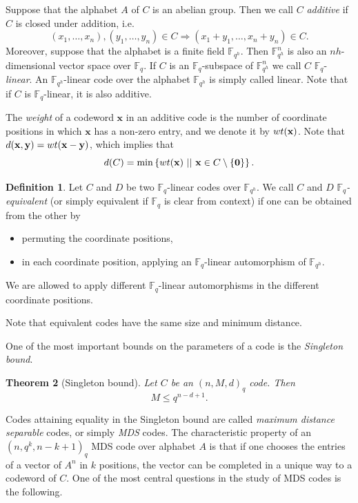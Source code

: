 \documentclass[a4paper]{article}
\newtheorem{thm}{Theorem}[section]
\theoremstyle{definition}
\newtheorem{df}[thm]{Definition}
\newcommand{\FF}{\mathbb F}
\newcommand{\set}[1]{ \left \{ #1 \right \} }
\newcommand{\sett}[2]{ \left\{ #1 \, \, || \, \, #2 \right \} }
\newcommand{\zero}{\mathbf 0}
\newcommand{\wt}{\textnormal{wt}}
\newcommand{\xx}{\mathbf x}
\newcommand{\yy}{\mathbf y}
\begin{document}
Suppose that the alphabet $A$ of $C$ is an abelian group.
Then we call $C$ \emph{additive} if $C$ is closed under addition, i.e.\
\[
 (x_1, \dots, x_n), (y_1,\dots,y_n) \in C \Longrightarrow (x_1+y_1, \dots, x_n+y_n) \in C.
\]
Moreover, suppose that the alphabet is a finite field $\FF_{q^h}$.
Then $\FF_{q^h}^n$ is also an $nh$-dimensional vector space over $\FF_q$.
If $C$ is an $\FF_q$-subspace of $\FF_{q^h}^n$ we call $C$ $\FF_q$-\emph{linear}.
An $\FF_{q^h}$-linear code over the alphabet $\FF_{q^h}$ is simply called linear.
Note that if $C$ is $\FF_q$-linear, it is also additive.

The \emph{weight} of a codeword $\xx$ in an additive code is the number of coordinate positions in which $\xx$ has a non-zero entry, and we denote it by $\wt(\xx)$.
Note that $d(\xx,\yy) = \wt(\xx-\yy)$, which implies that
\[
 d(C) = \min \sett{ \wt(\xx) }{ \xx \in C \setminus \set \zero }.
\]

\begin{df}
 \label{DefEq}
 Let $C$ and $D$ be two $\FF_q$-linear codes over $\FF_{q^h}$.
 We call $C$ and $D$ \emph{$\FF_q$-equivalent} (or simply equivalent if $\FF_q$ is clear from context) if one can be obtained from the other by
 \begin{itemize}
  \item permuting the coordinate positions,
  \item in each coordinate position, applying an $\FF_q$-linear automorphism of $\FF_{q^h}$.
 \end{itemize}
 We are allowed to apply different $\FF_q$-linear automorphisms in the different coordinate positions.
\end{df}

Note that equivalent codes have the same size and minimum distance.

One of the most important bounds on the parameters of a code is the \emph{Singleton bound}.
\begin{thm}[Singleton bound]
 Let $C$ be an $(n,M,d)_q$ code.
 Then
 \[
  M \leq q^{n-d+1}.
 \]
\end{thm}
Codes attaining equality in the Singleton bound are called \emph{maximum distance separable} codes, or simply \emph{MDS} codes.
The characteristic property of an $(n,q^k,n-k+1)_q$ MDS code over alphabet $A$ is that if one chooses the entries of a vector of $A^n$ in $k$ positions, the vector can be completed in a unique way to a codeword of $C$.
One of the most central questions in the study of MDS codes is the following.
\end{document}

